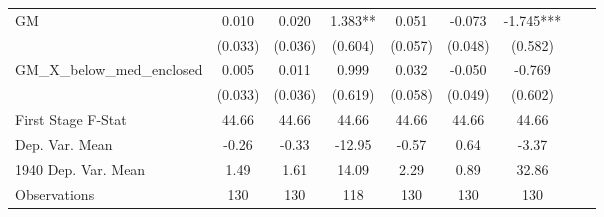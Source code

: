 \begin{tabular}{l*{8}{c}}
\cmidrule(lr){1-7}
GM              &    0.010   &    0.020   &    1.383** &    0.051   &   -0.073   &   -1.745***\\
                &  (0.033)   &  (0.036)   &  (0.604)   &  (0.057)   &  (0.048)   &  (0.582)   \\
\addlinespace
GM\_X\_below\_med\_enclosed&    0.005   &    0.011   &    0.999   &    0.032   &   -0.050   &   -0.769   \\
                &  (0.033)   &  (0.036)   &  (0.619)   &  (0.058)   &  (0.049)   &  (0.602)   \\
\midrule
First Stage F-Stat&    44.66   &    44.66   &    44.66   &    44.66   &    44.66   &    44.66   \\
Dep. Var. Mean  &    -0.26   &    -0.33   &   -12.95   &    -0.57   &     0.64   &    -3.37   \\
1940 Dep. Var. Mean&     1.49   &     1.61   &    14.09   &     2.29   &     0.89   &    32.86   \\
Observations    &      130   &      130   &      118   &      130   &      130   &      130   \\
 \bottomrule \end{tabular}
